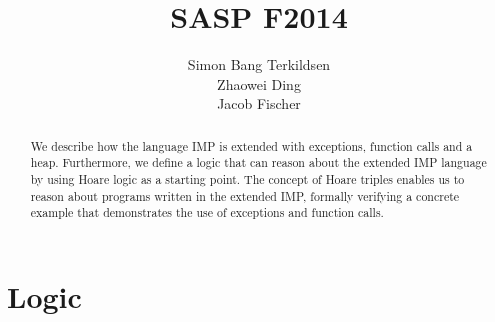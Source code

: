 \documentclass[citeauthoryear]{llncs} %
\title{SASP F2014}
\author{Simon Bang Terkildsen\\Zhaowei Ding\\Jacob Fischer}
\institute{IT University of Copenhagen}
\theoremstyle{definition}
\theoremstyle{notation}
\begin{document}
\maketitle

\begin{abstract}
We describe how the language IMP is extended with exceptions, function calls and a heap. Furthermore, we define a logic that can reason about the extended IMP language by using Hoare logic as a starting point. The concept of Hoare triples enables us to reason about programs written in the extended IMP, formally verifying a concrete example that demonstrates the use of exceptions and function calls.
\end{abstract}







\section{Logic}








\end{document}
